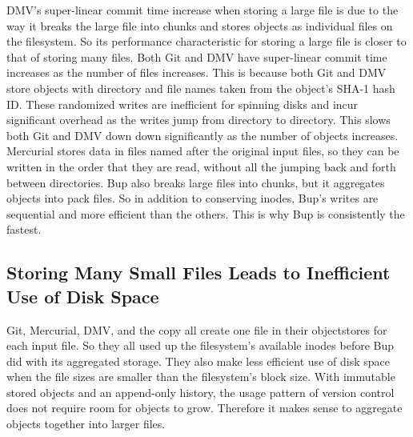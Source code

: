 DMV's super-linear commit time increase when storing a large file is due to the way it breaks the large file into chunks and stores objects as individual files on the filesystem.
So its performance characteristic for storing a large file is closer to that of storing many files.
Both Git and DMV have super-linear commit time increases as the number of files increases.
This is because both Git and DMV store objects with directory and file names taken from the object's SHA-1 hash ID.
These randomized writes are inefficient for spinning disks and incur significant overhead as the writes jump from directory to directory.
This slows both Git and DMV down down significantly as the number of objects increases.
Mercurial stores data in files named after the original input files, so they can be written in the order that they are read, without all the jumping back and forth between directories.
Bup also breaks large files into chunks, but it aggregates objects into pack files.
So in addition to conserving inodes, Bup's writes are sequential and more efficient than the others.
This is why Bup is consistently the fastest.


\subsection{Storing Many Small Files Leads to Inefficient Use of Disk Space}

Git, Mercurial, DMV, and the copy all create one file in their \glspl{objectstore} for each input file.
So they all used up the filesystem's available inodes before Bup did with its aggregated storage.
They also make less efficient use of disk space when the file sizes are smaller than the filesystem's block size.
With immutable stored objects and an append-only history, the usage pattern of version control does not require room for objects to grow.
Therefore it makes sense to aggregate objects together into larger files.

%
